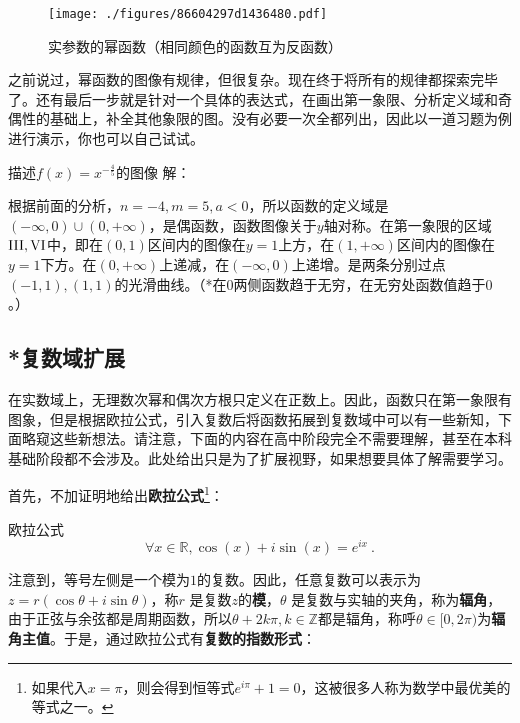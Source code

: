 \begin{figure}[ht]
\centering
\texttt{[image: ./figures/86604297d1436480.pdf]}
\caption{实参数的幂函数（相同颜色的函数互为反函数）}\label{fig_power_1}
\end{figure}

之前说过，幂函数的图像有规律，但很复杂。现在终于将所有的规律都探索完毕了。还有最后一步就是针对一个具体的表达式，在画出第一象限、分析定义域和奇偶性的基础上，补全其他象限的图。没有必要一次全都列出，因此以一道习题为例进行演示，你也可以自己试试。

\begin{exercise}{描述$f(x)=x^{-\frac{4}{5}}$的图像}
解：

根据前面的分析，$n=-4,m=5,a<0$，所以函数的定义域是$({-\infty},0)\cup(0,{+\infty})$，是偶函数，函数图像关于$y$轴对称。在第一象限的区域$\rm{III,VI}$中，即在$(0,1)$区间内的图像在$y=1$上方，在$(1,+\infty)$区间内的图像在$y=1$下方。在$(0,{+\infty})$上递减，在$({-\infty},0)$上递增。是两条分别过点$(-1,1),(1,1)$的光滑曲线。（*在$0$两侧函数趋于无穷，在无穷处函数值趋于$0$。）
\end{exercise}

\subsection{*复数域扩展}\label{sub_power_2}


在实数域上，无理数次幂和偶次方根只定义在正数上。因此，函数只在第一象限有图象，但是根据欧拉公式，引入复数后将函数拓展到复数域中可以有一些新知，下面略窥这些新想法。请注意，下面的内容在高中阶段完全不需要理解，甚至在本科基础阶段都不会涉及。此处给出只是为了扩展视野，如果想要具体了解需要学习。

首先，不加证明地给出\textbf{欧拉公式}\footnote{如果代入$x=\pi$，则会得到恒等式$e^{i\pi}+1=0$，这被很多人称为数学中最优美的等式之一。}：

\begin{theorem}{欧拉公式}
\begin{equation}
\forall x\in\mathbb{R},\cos(x) + i\sin(x)=e^{ix} ~.
\end{equation}
\end{theorem}

注意到，等号左侧是一个模为$1$的复数。因此，任意复数可以表示为 $z = r (\cos \theta + i \sin \theta)$，称$r$ 是复数$z$的\textbf{模}，$\theta$ 是复数与实轴的夹角，称为\textbf{辐角}，由于正弦与余弦都是周期函数，所以$\theta+2k\pi,k\in\mathbb{Z}$都是辐角，称呼$\theta\in[0,2\pi)$为\textbf{辐角主值}。于是，通过欧拉公式有\textbf{复数的指数形式}：

